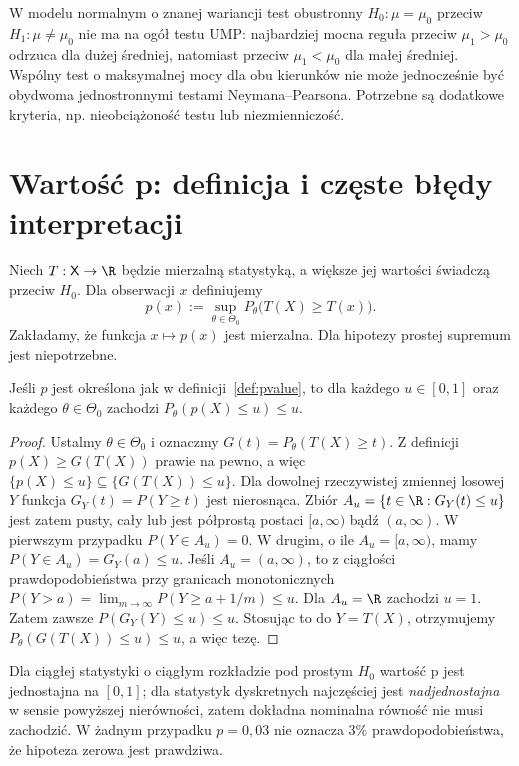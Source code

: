 \begin{uwaga}
W modelu normalnym o znanej wariancji test obustronny
$H_0:\mu=\mu_0$ przeciw $H_1:\mu\ne\mu_0$
nie ma na ogół testu UMP: najbardziej mocna reguła przeciw
$\mu_1>\mu_0$ odrzuca dla dużej średniej, natomiast przeciw
$\mu_1<\mu_0$ dla małej średniej. Wspólny test o maksymalnej
mocy dla obu kierunków nie może jednocześnie być obydwoma
jednostronnymi testami Neymana--Pearsona. Potrzebne są dodatkowe
kryteria, np. nieobciążoność testu lub niezmienniczość.
\end{uwaga}

\section{Wartość p: definicja i częste błędy interpretacji}
\begin{definicja}\label{def:pvalue}
Niech $T:\mathsf X\to\R$ będzie mierzalną statystyką,
a większe jej wartości świadczą przeciw $H_0$.
Dla obserwacji $x$ definiujemy
\[
 p(x):=\sup_{\theta\in\Theta_0}
 P_\theta\bigl(T(X)\ge T(x)\bigr).
\]
Zakładamy, że funkcja $x\mapsto p(x)$ jest mierzalna.
Dla hipotezy prostej supremum jest niepotrzebne.
\end{definicja}

\begin{twierdzenie}
\label{thm:pvalue-valid}
Jeśli $p$ jest określona jak w definicji~\ref{def:pvalue},
to dla każdego $u\in[0,1]$ oraz każdego $\theta\in\Theta_0$
zachodzi $P_\theta(p(X)\le u)\le u$.
\end{twierdzenie}
\begin{proof}
Ustalmy $\theta\in\Theta_0$ i oznaczmy
$G(t)=P_\theta(T(X)\ge t)$.
Z definicji $p(X)\ge G(T(X))$ prawie na pewno, a więc
$\{p(X)\le u\}\subseteq\{G(T(X))\le u\}$.
Dla dowolnej rzeczywistej zmiennej losowej $Y$ funkcja
$G_Y(t)=P(Y\ge t)$ jest nierosnąca. Zbiór
$A_u=\{t\in\R:G_Y(t)\le u\}$ jest zatem pusty,
cały lub jest półprostą postaci $[a,\infty)$ bądź
$(a,\infty)$. W pierwszym przypadku
$P(Y\in A_u)=0$. W drugim, o ile $A_u=[a,\infty)$,
mamy $P(Y\in A_u)=G_Y(a)\le u$.
Jeśli $A_u=(a,\infty)$, to z ciągłości prawdopodobieństwa
przy granicach monotonicznych
$P(Y>a)=\lim_{m\to\infty}P(Y\ge a+1/m)\le u$.
Dla $A_u=\R$ zachodzi $u=1$.
Zatem zawsze $P(G_Y(Y)\le u)\le u$. Stosując to do
$Y=T(X)$, otrzymujemy
$P_\theta(G(T(X))\le u)\le u$, a więc tezę.
\end{proof}

Dla ciągłej statystyki o ciągłym rozkładzie pod prostym
$H_0$ wartość p jest jednostajna na $[0,1]$; dla statystyk
dyskretnych najczęściej jest \emph{nadjednostajna} w sensie
powyższej nierówności, zatem dokładna nominalna równość nie
musi zachodzić. W żadnym przypadku $p=0{,}03$ nie oznacza
$3\%$ prawdopodobieństwa, że hipoteza zerowa jest prawdziwa.

